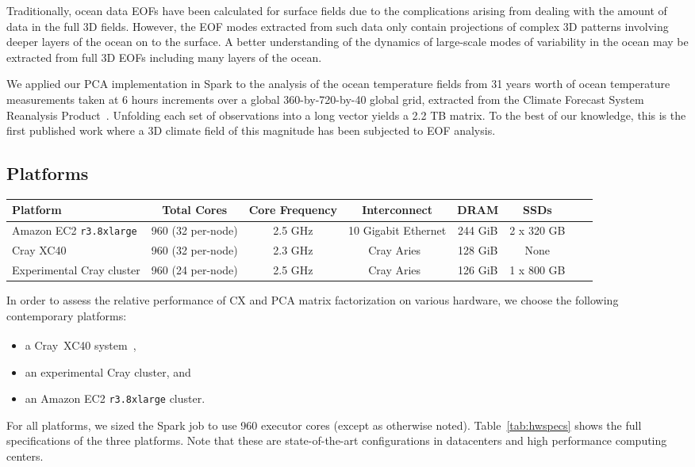Traditionally, ocean data EOFs have been calculated for surface fields due to
the complications arising from dealing with the amount of data in the full 3D fields. 
However, the EOF modes extracted from such data only
contain projections of complex 3D patterns involving deeper layers of the
ocean on to the surface. A better understanding of the dynamics of large-scale
modes of variability in the ocean may be extracted from full 3D EOFs including
many layers of the ocean. 

We applied our PCA implementation in Spark to the analysis of the ocean
temperature fields from 31 years worth of ocean temperature measurements taken
at 6 hours increments over a global 360-by-720-by-40 global grid, extracted
from the Climate Forecast System Reanalysis Product~\cite{Saha:2010ji}.
Unfolding each set of observations into a long vector yields a 2.2 TB matrix.
To the best of our knowledge, this is the first published work where a 3D
climate field of this magnitude has been subjected to EOF analysis.

\subsection{Platforms}

  \begin{table*}
    \begin{center}
    \begin{tabular}{| l | c | c | c | c | c | c | c |}
    \toprule
    \textbf{Platform} & \textbf{Total Cores} & \textbf{Core Frequency} & \textbf{Interconnect} & \textbf{DRAM} & \textbf{SSDs} \\
    \midrule
    Amazon EC2 \texttt{r3.8xlarge} & 960 (32 per-node) & 2.5 GHz & 10 Gigabit Ethernet & 244 GiB & 2 x 320 GB \\
    \midrule
    Cray XC40 & 960 (32 per-node) & 2.3 GHz & Cray Aries~\cite{alverson2012cray,craycascadesc12} & 128 GiB & None \\
    \midrule
    Experimental Cray cluster & 960 (24 per-node) & 2.5 GHz & Cray Aries~\cite{alverson2012cray,craycascadesc12} & 126 GiB & 1 x 800 GB \\
    \bottomrule
    \end{tabular}
    \end{center}
    \caption{Specifications of the three hardware platforms used in these performance experiments.}
    \label{tab:hwspecs}
  \end{table*}

 In order to assess the relative performance of CX and PCA matrix factorization on various hardware, we choose the following contemporary platforms:
 \begin{itemize}
 \item a Cray\textregistered~XC40\textsuperscript{\tiny\texttrademark}
 system~\cite{alverson2012cray,craycascadesc12},
 \item an experimental Cray cluster, and
 \item an Amazon EC2 \texttt{r3.8xlarge} cluster.
 \end{itemize}

 For all platforms, we sized the Spark job to use 960 executor cores (except as
 otherwise noted).  Table~\ref{tab:hwspecs} shows the full specifications of
 the three platforms. Note that these are state-of-the-art configurations in
 datacenters and high performance computing centers. 

